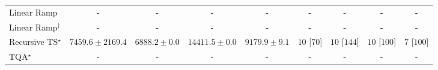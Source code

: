 \begin{tabular}{l|cccc|cccc|}
Linear Ramp & {\cellcolor[HTML]{000000}} \color[HTML]{F1F1F1} {\cellcolor{white}} \color{black} - & {\cellcolor[HTML]{000000}} \color[HTML]{F1F1F1} {\cellcolor{white}} \color{black} - & {\cellcolor[HTML]{000000}} \color[HTML]{F1F1F1} {\cellcolor{white}} \color{black} - & {\cellcolor[HTML]{000000}} \color[HTML]{F1F1F1} {\cellcolor{white}} \color{black} - & {\cellcolor[HTML]{000000}} \color[HTML]{F1F1F1} {\cellcolor{white}} \color{black} - & {\cellcolor[HTML]{000000}} \color[HTML]{F1F1F1} {\cellcolor{white}} \color{black} - & {\cellcolor[HTML]{000000}} \color[HTML]{F1F1F1} {\cellcolor{white}} \color{black} - & {\cellcolor[HTML]{000000}} \color[HTML]{F1F1F1} {\cellcolor{white}} \color{black} - \\
Linear Ramp$^\dagger$ & {\cellcolor[HTML]{000000}} \color[HTML]{F1F1F1} {\cellcolor{white}} \color{black} - & {\cellcolor[HTML]{000000}} \color[HTML]{F1F1F1} {\cellcolor{white}} \color{black} - & {\cellcolor[HTML]{000000}} \color[HTML]{F1F1F1} {\cellcolor{white}} \color{black} - & {\cellcolor[HTML]{000000}} \color[HTML]{F1F1F1} {\cellcolor{white}} \color{black} - & {\cellcolor[HTML]{000000}} \color[HTML]{F1F1F1} {\cellcolor{white}} \color{black} - & {\cellcolor[HTML]{000000}} \color[HTML]{F1F1F1} {\cellcolor{white}} \color{black} - & {\cellcolor[HTML]{000000}} \color[HTML]{F1F1F1} {\cellcolor{white}} \color{black} - & {\cellcolor[HTML]{000000}} \color[HTML]{F1F1F1} {\cellcolor{white}} \color{black} - \\
Recursive TS$^\star$ & {\cellcolor[HTML]{FFFEE2}} \color[HTML]{000000} $7459.6\pm 2169.4$ & {\cellcolor[HTML]{FFFFE5}} \color[HTML]{000000} $6888.2\pm 0.0$ & {\cellcolor[HTML]{FFF3B4}} \color[HTML]{000000} $14411.5\pm 0.0$ & {\cellcolor[HTML]{FFFCD7}} \color[HTML]{000000} $9179.9\pm 9.1$ & {\cellcolor[HTML]{49006A}} \color[HTML]{F1F1F1} $10$ [$70$] & {\cellcolor[HTML]{49006A}} \color[HTML]{F1F1F1} $10$ [$144$] & {\cellcolor[HTML]{49006A}} \color[HTML]{F1F1F1} $10$ [$100$] & {\cellcolor[HTML]{CD238F}} \color[HTML]{F1F1F1} $7$ [$100$] \\
TQA$^\star$ & {\cellcolor[HTML]{000000}} \color[HTML]{F1F1F1} {\cellcolor{white}} \color{black} - & {\cellcolor[HTML]{000000}} \color[HTML]{F1F1F1} {\cellcolor{white}} \color{black} - & {\cellcolor[HTML]{000000}} \color[HTML]{F1F1F1} {\cellcolor{white}} \color{black} - & {\cellcolor[HTML]{000000}} \color[HTML]{F1F1F1} {\cellcolor{white}} \color{black} - & {\cellcolor[HTML]{000000}} \color[HTML]{F1F1F1} {\cellcolor{white}} \color{black} - & {\cellcolor[HTML]{000000}} \color[HTML]{F1F1F1} {\cellcolor{white}} \color{black} - & {\cellcolor[HTML]{000000}} \color[HTML]{F1F1F1} {\cellcolor{white}} \color{black} - & {\cellcolor[HTML]{000000}} \color[HTML]{F1F1F1} {\cellcolor{white}} \color{black} - \\

\end{tabular}
